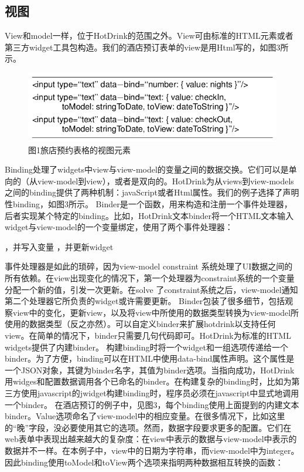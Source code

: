\subsection*{视图}
View和model一样，位于HotDrink的范围之外。View可由标准的HTML元素或者第三方widget工具包构造。我们的酒店预订表单的view是用Html写的，如图3所示。
\begin{figure}[!hbp]
  \begin{center}
    \includegraphics[scale=0.3]{figures/translation/translation_hotdrink_fig3.png}
    图1旅店预约表格的视图元素
  \end{center}
\end{figure}
Binding处理了widgets中view与view-model的变量之间的数据交换。它们可以是单向的（从view-model到view），或者是双向的。HotDrink为从views到view-models之间的binding提供了两种机制：javaScript或者Html属性。我们的例子选择了声明性binding，如图3所示。
Binder是一个函数，用来构造和注册一个事件处理器，后者实现某个特定的binding。比如，HotDrink文本binder将一个HTML文本输入widget与view-model的一个变量绑定，使用了两个事件处理器：
\begin{itemize}
  ，并写入变量
  ，并更新widget
\end{itemize}
事件处理器是如此的琐碎，因为view-model constraint 系统处理了UI数据之间的所有依赖。在view出现变化的情况下，第一个处理器为constraint系统的一个变量分配一个新的值，引发一次更新。在solve 了constraint系统之后，view-model通知第二个处理器它所负责的widget或许需要更新。
Binder包装了很多细节，包括观察view中的变化，更新view，以及将view中所使用的数据类型转换为view-model所使用的数据类型（反之亦然）。可以自定义binder来扩展hotdrink以支持任何view。在简单的情况下，binder只需要几句代码即可。HotDrink为标准的HTML widgets提供了内建binder。
构建binding时将一个widget和一组选项传递给一个binder。为了方便，binding可以在HTML中使用data-bind属性声明。这个属性是一个JSON对象，其键为binder名字，其值为binder选项。当指向成功，HotDrink用widges和配置数据调用各个已命名的binder。在构建复杂的binding时，比如为第三方使用javascript的jwidget构建binding时，程序员必须在javascript中显式地调用一个binder。
在酒店预订的例子中，见图3，每个binding使用上面提到的内建文本binder。Value选项命名了view-model中的相应变量。在很多情况下，比如这里的“晚”字段，没必要使用其它的选项。然而，数据字段要求更多的配置。它们在web表单中表现出越来越大的复杂度：在view中表示的数据与view-model中表示的数据并不一样。在本例子中，view中的日期为字符串，而view-model中为integer。因此binding使用toModel和toView两个选项来指明两种数据相互转换的函数：
